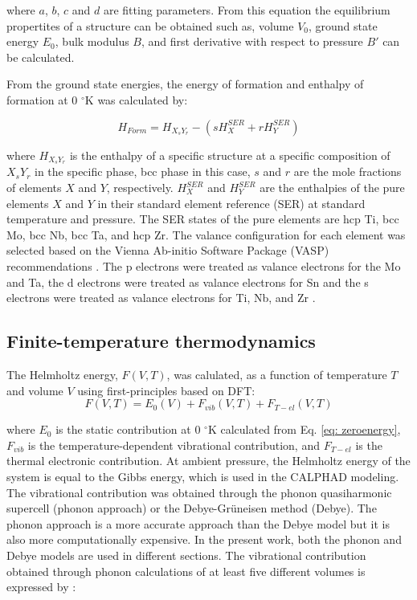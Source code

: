 \noindent where $a$, $b$, $c$ and $d$ are fitting parameters. From this equation the equilibrium propertites of a structure can be obtained such as, volume $V_0$, ground state energy $E_{0}$, bulk modulus $B$, and first derivative with respect to pressure $B'$ can be calculated. 

From the ground state energies, the energy of formation and enthalpy of formation at 0 $^\circ$K was calculated by:

\begin{equation}
\label{eq: hform}
H_{Form} = H_{X_{s}Y_{r}} - \left( s H_{X}^{SER} + rH_{Y}^{SER} \right) 
\end{equation}

where $H_{X_{s}Y_{r}}$ is the enthalpy of a specific structure at a specific composition of $X_{s}Y_{r}$ in the specific phase, bcc phase in this case, $s$ and $r$ are the mole fractions of elements $X$ and $Y$, respectively. $H_{X}^{SER}$ and $H_{Y}^{SER}$ are the enthalpies of the pure elements $X$ and $Y$ in their standard element reference (SER) at standard temperature and pressure. The SER states of the pure elements are hcp Ti, bcc Mo, bcc Nb, bcc Ta, and hcp Zr.  The valance configuration for each element was selected based on the Vienna Ab-initio Software Package (VASP) recommendations \cite{Kresse1996}. The p electrons were treated as valance electrons for the Mo and Ta, the d electrons were treated as valance electrons for Sn and the s electrons were treated as valance electrons for Ti, Nb, and Zr \cite{Kresse1996,Kresse1999}.

\subsection{Finite-temperature thermodynamics}

The Helmholtz energy, $F(V,T)$, was calulated, as a function of temperature $T$ and volume $V$ using first-principles based on DFT:
 \begin{equation}
 \label{eq: helmholtz}
 F(V,T) = E_{0}(V) + F_{vib}(V,T) + F_{T-el}(V,T)
 \end{equation}
 
\noindent where $E_0$ is the static contribution at 0 $^\circ$K calculated from Eq. \ref{eq: zeroenergy}, $F_{vib}$ is the temperature-dependent vibrational contribution, and $F_{T-el}$ is the thermal electronic contribution. At ambient pressure, the Helmholtz energy of the system is equal to the Gibbs energy, which is used in the CALPHAD modeling. The vibrational contribution was obtained through the phonon quasiharmonic supercell (phonon approach) or the Debye-Gr\"uneisen method (Debye). The phonon approach is a more accurate approach than the Debye model but it is also more computationally expensive. In the present work, both the phonon and Debye models are used in different sections. The vibrational contribution obtained through phonon calculations of at least five different volumes is expressed by \cite{Wang2012}:

